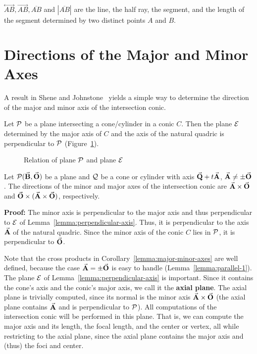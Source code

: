      $\stackrel{\longleftrightarrow}{AB}, \stackrel{\longrightarrow}{AB},
\overline{AB}$ and $|\overline{AB}|$ are the line, the half ray, the segment,
and the length of the segment determined by two distinct points $A$ and $B$.


\section{Directions of the Major and Minor Axes}
\label{section:determining-axes}

A result in Shene and Johnstone~\cite{shene:1991} 
yields a simple way to determine the direction of the 
major and minor axis of the intersection conic.  

\begin{lemma}
\label{lemma:perpendicular-axis}
    Let ${\cal P}$ be a plane intersecting a cone/cylinder in a conic 
$C$.  Then the plane ${\cal E}$ determined by the major axis of $C$ and the 
axis of the natural quadric is perpendicular to ${\cal P}$
(Figure~\ref{fig:perpendicular-stuff}).
\end{lemma}

\begin{figure}
\vspace{4cm}
\caption{Relation of plane ${\cal P}$ and plane ${\cal E}$}
\label{fig:perpendicular-stuff}
\end{figure}

\begin{corollary}
\label{lemma:major-minor-axes}
    Let ${\cal P}(\vec{\bf B},\vec{\bf O})$ be a plane 
and ${\cal Q}$ be a cone or cylinder with axis $\vec{\bf Q}+t\vec{\bf A}$,
$\vec{\bf A}\neq\pm\vec{\bf O}$.
The directions of the minor
and major axes of the intersection conic are $\vec{\bf A}\times\vec{\bf O}$ and 
$\vec{\bf O}\times(\vec{\bf A}\times\vec{\bf O})$, respectively.  
\end{corollary}
{\bf Proof:}
The minor axis is perpendicular to the major axis and thus perpendicular
to ${\cal E}$ of Lemma~\ref{lemma:perpendicular-axis}.
Thus, it is perpendicular to the axis $\vec{\bf A}$ of the natural quadric.
Since the minor axis of the conic $C$ lies in ${\cal P}$,
it is perpendicular to $\vec{\bf O}$.
\QED

Note that the cross products in Corollary~\ref{lemma:major-minor-axes} are 
well defined, because the case $\vec{\bf A}=\pm\vec{\bf O}$ is easy to handle
(Lemma~\ref{lemma:parallel-1}).
The plane ${\cal E}$ of Lemma~\ref{lemma:perpendicular-axis} is important.
Since it contains the cone's axis and the conic's major axis,
we call it the {\bf axial plane}.
The axial plane is trivially computed, since its normal is the minor axis 
$\vec{\bf A}\times\vec{\bf O}$ (the axial plane contains $\vec{\bf A}$
and is perpendicular to ${\cal P}$).
All computations of the intersection conic will be performed in this plane.
That is, we can compute the major axis and its length, the focal length,
and the center or vertex, all while restricting to the axial plane,
since the axial plane contains the major axis and (thus) the foci and center.

